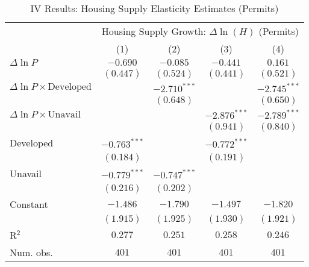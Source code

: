 
\begin{table}
\caption{IV Results: Housing Supply Elasticity Estimates (Permits)}
\begin{center}
\begin{normalsize}
\begin{threeparttable}
\begin{tabular}{l@{} c@{} c@{} c@{} c@{}}
\toprule
 & \multicolumn{4}{c}{Housing Supply Growth: $\Delta\ln(H)$ (Permits)} \\
\cmidrule(lr){2-5}
 & (1) & (2) & (3) & (4) \\
\midrule
$\Delta\ln P$                         & $-0.690$       & $-0.085$       & $-0.441$       & $0.161$        \\
                                      & $(0.447)$      & $(0.524)$      & $(0.441)$      & $(0.521)$      \\
$\Delta\ln P\times{\text{Developed}}$ &                & $-2.710^{***}$ &                & $-2.745^{***}$ \\
                                      &                & $(0.648)$      &                & $(0.650)$      \\
$\Delta\ln P\times{\text{Unavail}}$   &                &                & $-2.876^{***}$ & $-2.789^{***}$ \\
                                      &                &                & $(0.941)$      & $(0.840)$      \\
Developed                             & $-0.763^{***}$ &                & $-0.772^{***}$ &                \\
                                      & $(0.184)$      &                & $(0.191)$      &                \\
Unavail                               & $-0.779^{***}$ & $-0.747^{***}$ &                &                \\
                                      & $(0.216)$      & $(0.202)$      &                &                \\
Constant                              & $-1.486$       & $-1.790$       & $-1.497$       & $-1.820$       \\
                                      & $(1.915)$      & $(1.925)$      & $(1.930)$      & $(1.921)$      \\
\midrule
R$^2$                                 & $0.277$        & $0.251$        & $0.258$        & $0.246$        \\
Num. obs.                             & $401$          & $401$          & $401$          & $401$          \\

\end{tabular}
\end{threeparttable}
\end{normalsize}
\end{center}
\end{table}
